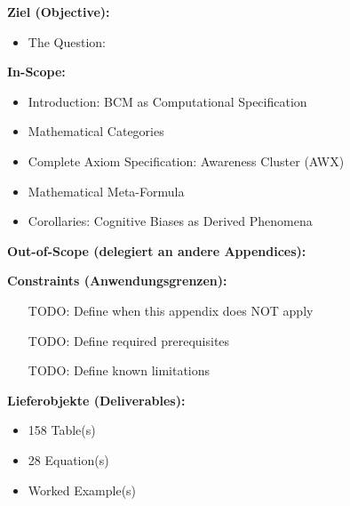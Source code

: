 \begin{tcolorbox}[
    colback=orange!5!white,
    colframe=orange!75!black,
    title={\textbf{Appendix Scope: Ziel / In-Scope / Out-of-Scope / Constraints}},
    fonttitle=\bfseries
]

\textbf{Ziel (Objective):}
\begin{itemize}[nosep]
    \item The Question:
\end{itemize}

\textbf{In-Scope:}
\begin{itemize}[nosep]
    \item Introduction: BCM as Computational Specification
    \item Mathematical Categories
    \item Complete Axiom Specification: Awareness Cluster (AWX)
    \item Mathematical Meta-Formula
    \item Corollaries: Cognitive Biases as Derived Phenomena
\end{itemize}

\textbf{Out-of-Scope (delegiert an andere Appendices):}

\textbf{Constraints (Anwendungsgrenzen):}
\begin{itemize}[nosep]
    \item [TODO: Define when this appendix does NOT apply]
    \item [TODO: Define required prerequisites]
    \item [TODO: Define known limitations]
\end{itemize}

\textbf{Lieferobjekte (Deliverables):}
\begin{itemize}[nosep]
    \item 158 Table(s)
    \item 28 Equation(s)
    \item Worked Example(s)
\end{itemize}

\end{tcolorbox}


